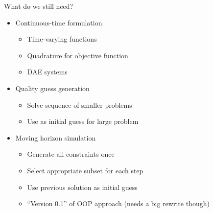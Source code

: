 \documentclass[xcolor=dvipsnames]{beamer}
\begin{document}
\begin{frame}{What do we still need?}
    \begin{itemize}
        \item Continuous-time formulation
        \begin{itemize}
            \item Time-varying functions
            \item Quadrature for objective function
            \item DAE systems
        \end{itemize}
        \item Quality guess generation
        \begin{itemize}
            \item Solve sequence of smaller problems
            \item Use as initial guess for large problem
        \end{itemize}
        \item Moving horizon simulation
        \begin{itemize}
            \item Generate all constraints once
            \item Select appropriate subset for each step
            \item Use previous solution as initial guess
            \item ``Version 0.1'' of OOP approach (needs a big rewrite though)
        \end{itemize}
    \end{itemize}
\end{frame}
\end{document}
